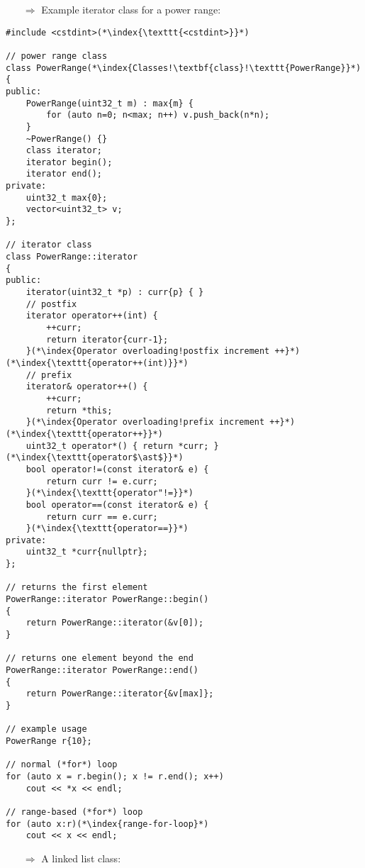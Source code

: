 \documentclass[10pt]{book}
\begin{document}
\begin{enumerate}
\item[$\Rightarrow$] Example iterator class for a power range:
\end{enumerate}
\begin{lstlisting}
#include <cstdint>(*\index{\texttt{<cstdint>}}*)

// power range class
class PowerRange(*\index{Classes!\textbf{class}!\texttt{PowerRange}}*)
{
public:
    PowerRange(uint32_t m) : max{m} {
        for (auto n=0; n<max; n++) v.push_back(n*n);
    }
    ~PowerRange() {}
    class iterator;
    iterator begin();
    iterator end();
private:
    uint32_t max{0};
    vector<uint32_t> v;
};

// iterator class
class PowerRange::iterator
{
public:
    iterator(uint32_t *p) : curr{p} { }
    // postfix
    iterator operator++(int) {
        ++curr;
        return iterator{curr-1};
    }(*\index{Operator overloading!postfix increment ++}*)(*\index{\texttt{operator++(int)}}*)
    // prefix
    iterator& operator++() {
        ++curr;
        return *this;
    }(*\index{Operator overloading!prefix increment ++}*)(*\index{\texttt{operator++}}*)
    uint32_t operator*() { return *curr; }(*\index{\texttt{operator$\ast$}}*)
    bool operator!=(const iterator& e) {
        return curr != e.curr;
    }(*\index{\texttt{operator"!=}}*)
    bool operator==(const iterator& e) {
        return curr == e.curr;
    }(*\index{\texttt{operator==}}*)
private:
    uint32_t *curr{nullptr};
};

// returns the first element
PowerRange::iterator PowerRange::begin()
{
    return PowerRange::iterator(&v[0]);
}

// returns one element beyond the end
PowerRange::iterator PowerRange::end()
{
    return PowerRange::iterator{&v[max]};
}

// example usage
PowerRange r{10};
    
// normal (*for*) loop
for (auto x = r.begin(); x != r.end(); x++)
    cout << *x << endl;

// range-based (*for*) loop
for (auto x:r)(*\index{range-for-loop}*)
    cout << x << endl;
\end{lstlisting}
\begin{enumerate}
\item[$\Rightarrow$] A linked list class:
\end{enumerate}
\end{document}
